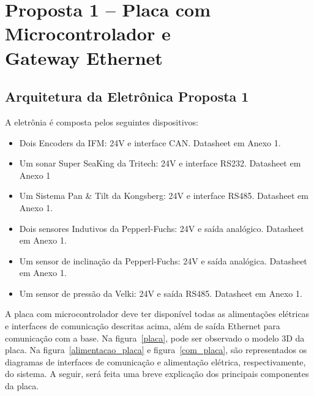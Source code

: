 


\section[Proposta 1 – Placa com Microcontrolador e Gateway Ethernet]{Proposta 1
– Placa com Microcontrolador e \\Gateway Ethernet}

\subsection{Arquitetura da Eletrônica Proposta 1}
A eletrônia é composta pelos seguintes dispositivos:
\begin{itemize}
  \item Dois Encoders da IFM: 24V e interface CAN. Datasheet em Anexo 1.
  \item Um sonar Super SeaKing da Tritech: 24V e interface RS232. Data\-sheet em
  Anexo 1
  \item Um Sistema Pan \& Tilt da Kongsberg: 24V e interface RS485. Data\-sheet
  em Anexo 1.
  \item Dois sensores Indutivos da Pepperl-Fuchs: 24V e saída ana\-lógico.
  Data\-sheet em Anexo 1.
  \item Um sensor de inclinação da Pepperl-Fuchs: 24V e saída analógica.
  Data\-sheet em Anexo 1.
  \item Um sensor de pressão da Velki: 24V e saída RS485. Datasheet em Anexo 1.
\end{itemize}

A placa com microcontrolador deve ter disponível todas as alimentações elétricas
e interfaces de comunicação descritas acima, além de saída Ethernet para
comunicação com a base. Na figura~\ref{placa}, pode ser observado o modelo 3D da
placa. Na figura~\ref{alimentacao_placa} e figura~\ref{com_placa}, são
representados os diagramas de interfaces de comunicação e alimentação elétrica,
respectivamente, do sistema. A seguir, será feita uma breve explicação dos
principais componentes da placa.


